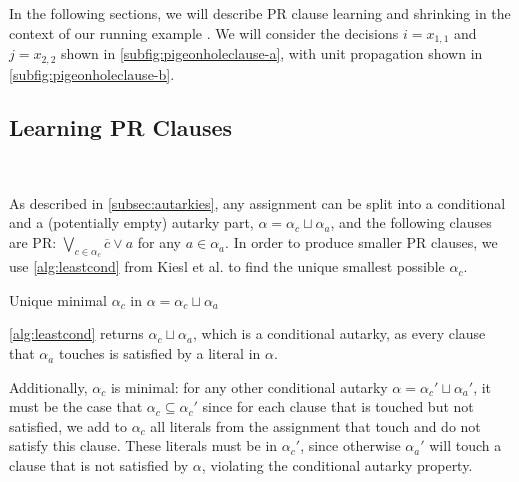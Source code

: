 In the following sections, we will describe PR clause learning and shrinking in
the context of our running example  . We will consider the decisions $i =
x_{1, 1}$ and $j = x_{2, 2}$ shown in \autoref{subfig:pigeonholeclause-a}, with
unit propagation shown in \autoref{subfig:pigeonholeclause-b}.

\subsection{Learning PR Clauses}~\label{subsec:learning}


As described in \autoref{subsec:autarkies}, any assignment can be split into a
conditional and a (potentially empty) autarky part, $\alpha = \alpha_c \sqcup \alpha_a$, and the
following clauses are PR: $\bigvee_{c \in \alpha_c} \overline{c} \lor a$ for
any $a \in \alpha_a$. In order to produce smaller PR clauses, we use
\autoref{alg:leastcond} from Kiesl et al. \cite{conditionalautarkies} to find
the unique smallest possible $\alpha_c$.



\begin{algorithm}
    \caption{Unique minimal $\alpha_c$ in $\alpha = \alpha_c \sqcup
    \alpha_a$}\label{alg:leastcond} \SetAlgoNoLine
     
      

\end{algorithm}

\autoref{alg:leastcond} returns $\alpha_c \sqcup \alpha_a$, which is a
conditional autarky, as every clause that $\alpha_a$ touches is satisfied by a
literal in $\alpha$.

Additionally, $\alpha_c$ is minimal: for any other conditional autarky $\alpha =
\alpha_c' \sqcup \alpha_a'$, it must be the case that $\alpha_c \subseteq
\alpha_c'$ since for each clause that is touched but not satisfied, we add to
$\alpha_c$ all literals from the assignment that touch and do not satisfy this
clause. These literals must be in $\alpha_c'$, since otherwise $\alpha_a'$ will touch a
clause that is not satisfied by $\alpha$, violating the conditional autarky
property.

